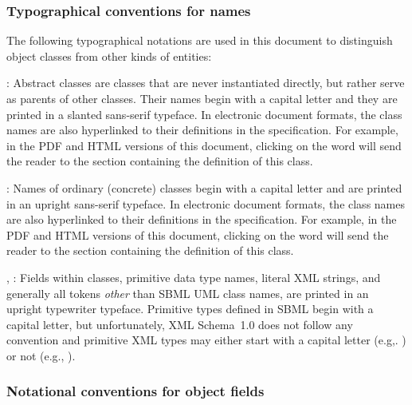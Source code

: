 \subsubsection{Typographical conventions for names}
\label{sec:typographical}

The following typographical notations are used in this document to
distinguish object classes from other kinds of entities:

\begin{description}
  
\item {}: Abstract classes are classes
  that are never instantiated directly, but rather serve as
  parents of other classes.  Their names begin with a capital
  letter and they are printed in a slanted sans-serif typeface.
  In electronic document formats, the class names are also
  hyperlinked to their definitions in the specification.  For
  example, in the PDF and HTML versions of this document, clicking
  on the word \SBase will send the reader to the section
  containing the definition of this class.
  
\item {}: Names of ordinary (concrete) classes begin
  with a capital letter and are printed in an upright sans-serif
  typeface.  In electronic document formats, the class names are
  also hyperlinked to their definitions in the specification.  For
  example, in the PDF and HTML versions of this document, clicking
  on the word \Species will send the reader to the section
  containing the definition of this class.

\item {}, : Fields within
  classes, primitive data type names, literal XML strings, and
  generally all tokens \emph{other} than SBML UML class names, are
  printed in an upright typewriter typeface.  Primitive types
  defined in SBML begin with a capital letter, but unfortunately,
  XML Schema~1.0 does not follow any convention and primitive XML
  types may either start with a capital letter (e.g,.
  ) or not (e.g., ).

\end{description}


\subsubsection{Notational conventions for object fields}
\label{sec:notation-fields}

